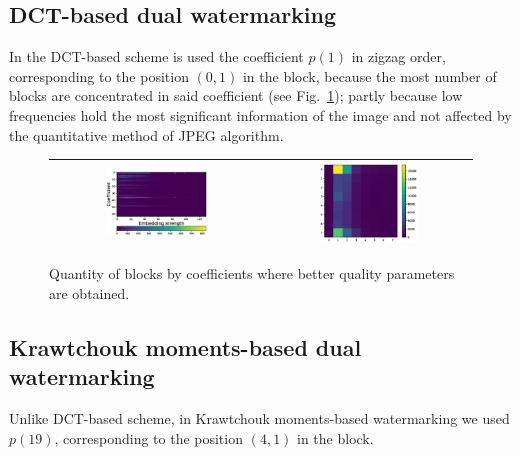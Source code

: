\documentclass[runningheads]{llncs}
\begin{document}
\subsection{DCT-based dual watermarking}
In the DCT-based scheme is used the coefficient $p(1)$ in zigzag order, corresponding to the position $(0, 1)$ in the block, because the most number of blocks are concentrated in said coefficient (see Fig.~\ref{colormapDCT}); partly because low frequencies hold the most significant information of the image and not affected by the quantitative method of JPEG algorithm.
\begin{figure}[H]
	\begin{center}
		\begin{tabular}{|c|c|}\hline
			\includegraphics[width=0.5\textwidth]{colormapDCT.eps}
			&\includegraphics[width=0.5\textwidth]{coefDCT.eps}\\\hline
		\end{tabular}
	\end{center}
	\caption{Quantity of blocks by coefficients where better quality parameters are obtained.}
	\label{colormapDCT}
\end{figure}

\subsection{Krawtchouk moments-based dual watermarking}
Unlike DCT-based scheme, in Krawtchouk moments-based watermarking we used $p(19)$, corresponding to the position $(4, 1)$ in the block.
 
\end{document}
